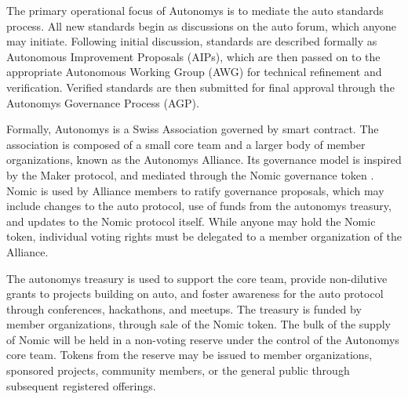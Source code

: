 \documentclass[twocolumn, 10pt]{article}
\begin{document}
The primary operational focus of Autonomys is to mediate the auto standards process. All new standards begin as discussions on the auto forum, which anyone may initiate. Following initial discussion, standards are described formally as Autonomous Improvement Proposals (AIPs), which are then passed on to the appropriate Autonomous Working Group (AWG) for technical refinement and verification. Verified standards are then submitted for final approval through the Autonomys Governance Process (AGP). 

Formally, Autonomys is a Swiss Association governed by smart contract. The association is composed of a small core team and a larger body of member organizations, known as the Autonomys Alliance. Its governance model is inspired by the Maker protocol, and mediated through the Nomic governance token \cite{Maker}. Nomic is used by Alliance members to ratify governance proposals, which may include changes to the auto protocol, use of funds from the autonomys treasury, and updates to the Nomic protocol itself. While anyone may hold the Nomic token, individual voting rights must be delegated to a member organization of the Alliance.

The autonomys treasury is used to support the core team, provide non-dilutive grants to projects building on auto, and foster awareness for the auto protocol through conferences, hackathons, and meetups. The treasury is funded by member organizations, through sale of the Nomic token. The bulk of the supply of Nomic will be held in a non-voting reserve under the control of the Autonomys core team. Tokens from the reserve may be issued to member organizations, sponsored projects, community members, or the general public through subsequent registered offerings.

\printbibliography
\end{document}
